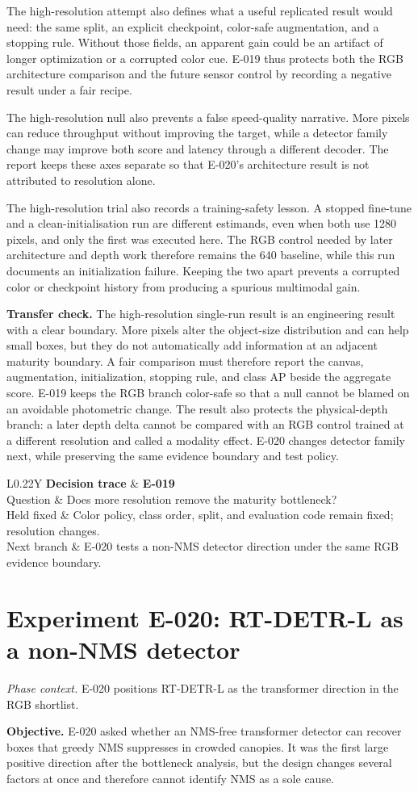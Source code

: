 \documentclass[preprint,12pt]{elsarticle}
\newcommand{\experiment}[2]{\par\medskip\Needspace{7\baselineskip}\section{Experiment #1: #2}}
\newcommand{\decisioncard}[4]{%
\begin{table}[H]\centering\small
\begin{tabularx}{\columnwidth}{L{0.22\columnwidth}Y}
\toprule
\textbf{Decision trace} & \textbf{#1}\\
Question & #2\\
Held fixed & #3\\
Next branch & #4\\
\bottomrule
\end{tabularx}
\end{table}}
\newcommand{\phasecontext}[1]{%
\par\smallskip\noindent\textit{Phase context.} #1\par\smallskip}
\begin{document}
The high-resolution attempt also defines what a useful replicated
result would need:
the same split, an explicit checkpoint, color-safe augmentation, and a
stopping rule. Without those fields, an apparent gain could be an artifact of
longer optimization or a corrupted color cue. E-019 thus protects both the
RGB architecture comparison and the future sensor control by recording a
negative result under a fair recipe.

The high-resolution null also prevents a false speed-quality narrative. More
pixels can reduce throughput without improving the target, while a detector
family change may improve both score and latency through a different decoder.
The report keeps these axes separate so that E-020's architecture result is
not attributed to resolution alone.

The high-resolution trial also records a training-safety lesson. A stopped
fine-tune and a clean-initialisation run are different estimands, even when
both use 1280 pixels, and only the first was executed here. The RGB control
needed by later architecture and depth work therefore remains the 640
baseline, while this run documents an initialization failure. Keeping the two
apart prevents a corrupted color or checkpoint history from producing a
spurious multimodal gain.

\textbf{Transfer check.} The high-resolution single-run result is an engineering result
with a clear boundary. More pixels alter the object-size distribution and can
help small boxes, but they do not automatically add information at an
adjacent maturity boundary. A fair comparison must therefore report the
canvas, augmentation, initialization, stopping rule, and class AP beside the
aggregate score. E-019 keeps the RGB branch color-safe so that a null cannot
be blamed on an avoidable photometric change. The result also protects the
physical-depth branch: a later depth delta cannot be compared with an RGB
control trained at a different resolution and called a modality effect.
E-020 changes detector family next, while preserving the same evidence
boundary and test policy.

\decisioncard{E-019}{Does more resolution remove the maturity bottleneck?}{Color policy, class order, split, and evaluation code remain fixed; resolution changes.}{E-020 tests a non-NMS detector direction under the same RGB evidence boundary.}
\experiment{E-020}{RT-DETR-L as a non-NMS detector}
\phasecontext{E-020 positions RT-DETR-L as the transformer direction in the RGB shortlist.}
\textbf{Objective.} E-020 asked whether an NMS-free transformer detector can
recover boxes that greedy NMS suppresses in crowded canopies. It was the first
large positive direction after the bottleneck analysis, but the design changes
several factors at once and therefore cannot identify NMS as a sole cause.
\end{document}
